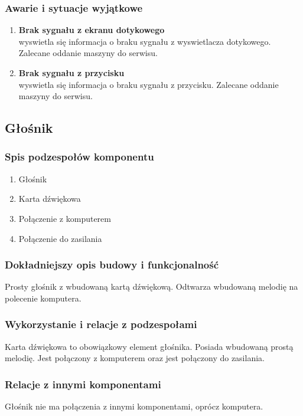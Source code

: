 \documentclass[12pt,a4paper,notitlepage]{article}
\begin{document}
\normalsize

\subsubsection{Awarie i sytuacje wyjątkowe}
\begin{enumerate}
  \item \textbf{Brak sygnału z ekranu dotykowego}\\ wyswietla się informacja o braku sygnału z wyswietlacza dotykowego. Zalecane oddanie maszyny do serwisu.
  \item \textbf{Brak sygnału z przycisku}\\ wyswietla się informacja o braku sygnału z przycisku. Zalecane oddanie maszyny do serwisu.
\end{enumerate}




\subsection{Głośnik}
\subsubsection{Spis podzespołów komponentu}
\begin{enumerate}
  \item Głośnik
  \item Karta dźwiękowa
  \item Połączenie z komputerem
  \item Połączenie do zasilania
\end{enumerate}

\subsubsection{Dokładniejszy opis budowy i funkcjonalność}
Prosty głośnik z wbudowaną kartą dźwiękową. Odtwarza wbudowaną melodię na polecenie komputera.
 
\subsubsection{Wykorzystanie i relacje z podzespołami}
Karta dźwiękowa to obowiązkowy element głośnika. Posiada wbudowaną prostą melodię. Jest połączony z komputerem oraz jest połączony do zasilania.

\subsubsection{Relacje z innymi komponentami}
Głośnik nie ma połączenia z innymi komponentami, oprócz komputera.
\end{document}
